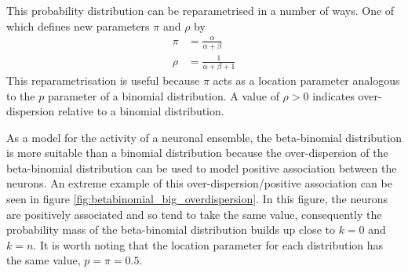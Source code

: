       This probability distribution can be reparametrised in a number of ways. One of which defines new parameters $\pi$ and $\rho$ by
      \begin{align}\label{eq:betabinomial_reparam}
        \pi &= \frac{\alpha}{\alpha + \beta} \\
        \rho &= \frac{1}{\alpha + \beta + 1}
      \end{align}
      This reparametrisation is useful because $\pi$ acts as a location parameter analogous to the $p$ parameter of a binomial distribution. A value of $\rho > 0$ indicates over-dispersion relative to a binomial distribution.

      As a model for the activity of a neuronal ensemble, the beta-binomial distribution is more suitable than a binomial distribution because the over-dispersion of the beta-binomial distribution can be used to model positive association between the neurons. An extreme example of this over-dispersion/positive association can be seen in figure \ref{fig:betabinomial_big_overdispersion}. In this figure, the neurons are positively associated and so tend to take the same value, consequently the probability mass of the beta-binomial distribution builds up close to $k=0$ and $k=n$. It is worth noting that the location parameter for each distribution has the same value, $p=\pi=0.5$.

